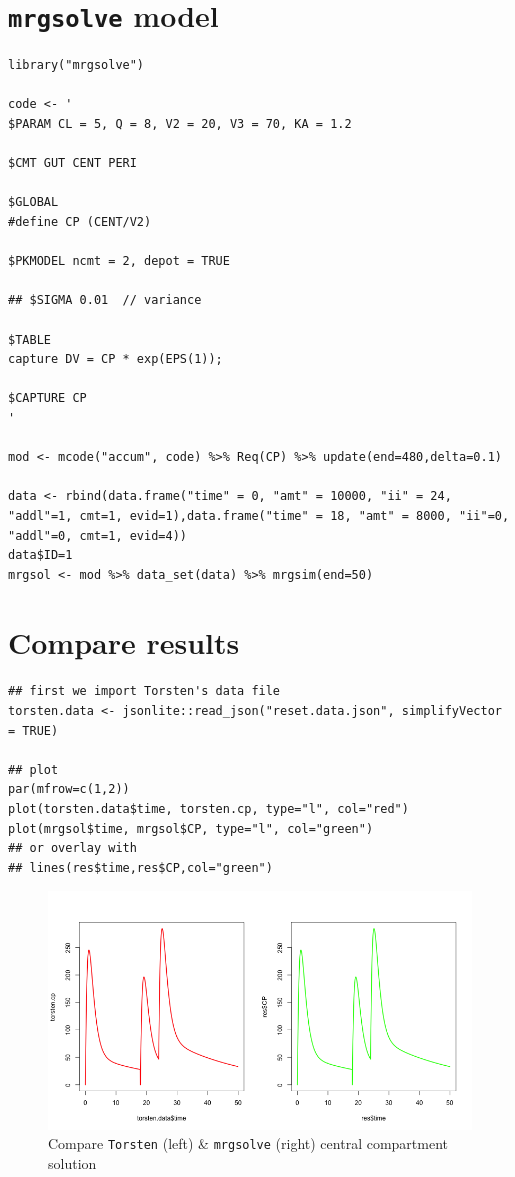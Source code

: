 \documentclass[11pt]{article}
\begin{document}
\section{\texttt{mrgsolve} model}
\label{sec:org88c1f76}
\begin{verbatim}
library("mrgsolve")

code <- '
$PARAM CL = 5, Q = 8, V2 = 20, V3 = 70, KA = 1.2

$CMT GUT CENT PERI

$GLOBAL
#define CP (CENT/V2)

$PKMODEL ncmt = 2, depot = TRUE

## $SIGMA 0.01  // variance

$TABLE
capture DV = CP * exp(EPS(1));

$CAPTURE CP
'

mod <- mcode("accum", code) %>% Req(CP) %>% update(end=480,delta=0.1)

data <- rbind(data.frame("time" = 0, "amt" = 10000, "ii" = 24, "addl"=1, cmt=1, evid=1),data.frame("time" = 18, "amt" = 8000, "ii"=0, "addl"=0, cmt=1, evid=4))
data$ID=1
mrgsol <- mod %>% data_set(data) %>% mrgsim(end=50)
\end{verbatim}

\section{Compare results}
\label{sec:org71d43be}
\begin{verbatim}
## first we import Torsten's data file
torsten.data <- jsonlite::read_json("reset.data.json", simplifyVector = TRUE)

## plot
par(mfrow=c(1,2))
plot(torsten.data$time, torsten.cp, type="l", col="red")
plot(mrgsol$time, mrgsol$CP, type="l", col="green")
## or overlay with
## lines(res$time,res$CP,col="green")
\end{verbatim}

\begin{figure}[htbp]
\centering
\includegraphics[width=\textwidth]{./reset_compare.png}
\caption{Compare \texttt{Torsten} (left) \& \texttt{mrgsolve} (right) central compartment solution}
\end{figure}
\end{document}
